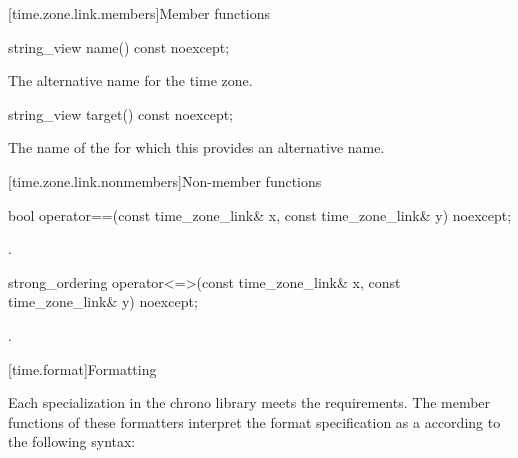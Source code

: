 [time.zone.link.members]{Member functions}

%
\begin{itemdecl}
string_view name() const noexcept;
\end{itemdecl}

\begin{itemdescr}
\pnum
\returns
The alternative name for the time zone.
\end{itemdescr}

%
\begin{itemdecl}
string_view target() const noexcept;
\end{itemdecl}

\begin{itemdescr}
\pnum
\returns
The name of the  for which
this  provides an alternative name.
\end{itemdescr}

[time.zone.link.nonmembers]{Non-member functions}

%
\begin{itemdecl}
bool operator==(const time_zone_link& x, const time_zone_link& y) noexcept;
\end{itemdecl}

\begin{itemdescr}
\pnum
\returns
{}.
\end{itemdescr}

%
\begin{itemdecl}
strong_ordering operator<=>(const time_zone_link& x, const time_zone_link& y) noexcept;
\end{itemdecl}

\begin{itemdescr}
\pnum
\returns
{}.
\end{itemdescr}

[time.format]{Formatting}
%

\pnum
Each  specialization
in the chrono library
meets the  requirements.
The  member functions of these formatters
interpret the format specification
as a 
according to the following syntax:

